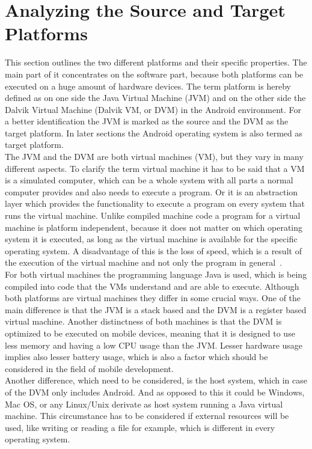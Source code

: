 \section{Analyzing the Source and Target Platforms} 
\label{sec:migration:analysing-the-source-and-target-platform}
This section outlines the two different platforms and their specific properties.%
The main part of it concentrates on the software part, because both platforms can be executed on a huge amount of hardware devices.
The term platform is hereby defined as on one side the Java Virtual Machine (JVM) and on the other side the Dalvik Virtual Machine (Dalvik VM, or DVM) in the Android environment.
For a better identification the JVM is marked as the source and the DVM as the target platform.
In later sections the Android operating system is also termed as target platform.
\\
The JVM and the DVM are both virtual machines (VM), but they vary in many different aspects.
To clarify the term virtual machine it has to be said that a VM is a simulated computer, which can be a whole system with all parts a normal computer provides and also needs to execute a program.
Or it is an abstraction layer which provides the functionality to execute a program on every system that runs the virtual machine.
Unlike compiled machine code a program for a virtual machine is platform independent, because it does not matter on which operating system it is executed, as long as the virtual machine is available for the specific operating system.
A disadvantage of this is the loss of speed, which is a result of the execution of the virtual machine and not only the program in general~\cite{craig2006virtual}.
\\
For both virtual machines the programming language Java is used, which is being compiled into code that the VMs understand and are able to execute.
Although both platforms are virtual machines they differ in some crucial ways.
One of the main difference is that the JVM is a stack based and the DVM is a register based virtual machine.
Another distinctness of both machines is that the DVM is optimized to be executed on mobile devices, meaning that it is designed to use less memory and having a low CPU usage than the JVM.
Lesser hardware usage implies also lesser battery usage, which is also a factor which should be considered in the field of mobile development.\\
Another difference, which need to be considered, is the host system, which in case of the DVM only includes Android.
And as opposed to this it could be Windows, Mac OS, or any Linux/Unix derivate as host system running a Java virtual machine. 
This circumstance has to be considered if external resources will be used, like writing or reading a file for example, which is different in every operating system.


